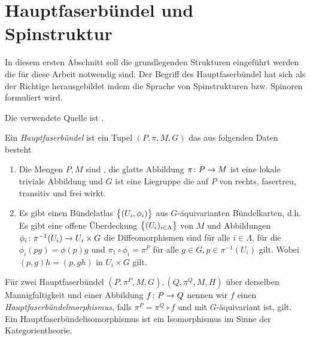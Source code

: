 

\section{Hauptfaserbündel und Spinstruktur}
\label{sec:Hauptfaserbündel und Spinstruktur}

In diesem ersten Abschnitt soll die grundlegenden Strukturen
eingeführt werden die für diese Arbeit notwendig sind. Der Begriff des
Hauptfaserbündel hat sich als der Richtige herausgebildet indem die
Sprache von Spinstrukturen bzw. Spinoren formuliert wird.

Die verwendete Quelle ist \cite{baum09}.

\begin{Def}[Hauptfaserbündel]
  Ein \textit{Hauptfaserbündel} ist ein Tupel $(P,\pi,M,G)$ das aus
  folgenden Daten besteht
	\begin{enumerate}[\textbullet]
        \item Die Mengen $P,M$ sind \mfgen, die glatte Abbildung
          $ \pi \colon P \rightarrow M $ ist eine lokale triviale Abbildung und
          $G$ ist eine Liegruppe die auf $P$ von rechts, fasertreu,
          transitiv und frei wirkt.   
        \item Es gibt einen Bündelatlas $\bigl\{ (U_i,\phi_i) \bigr\}$ aus
          $G$-äquivarianten Bündelkarten, d.h.  Es gibt
           eine offene Überdeckung $\bigl\{ (U_i)_{i \in \Lambda} \bigr\}$ von $ M $ und  Abbildungen
          $ \phi_i \colon \pi^{-1}(U_i) \rightarrow U_i\times G $ die
          Diffeomorphismen sind für alle $i \in \Lambda $, für die
          $ \phi_i(pg) = \phi(p) g $ und
          $ \pi_1 \circ \phi_i = \pi^P $ für alle
          $ g \in G, p \in \pi^{-1}(U_i) $ gilt. Wobei
          $ (p,g) h = (p,gh) $ in $ U_i\times G $ gilt.
	\end{enumerate}		
	Für zwei Hauptfaserbündel $(P,\pi^P,M,G),(Q,\pi^Q,M,H)$ über
        derselben Mannigfaltigkeit und einer Abbildung $f \colon P \rightarrow Q$
        nennen wir $f$ einen \textit{Hauptfaserbündelmorphismus},
        falls $ \pi^P=\pi^Q \circ f $ und mit $ G $-äquivariant ist, gilt. Ein Hauptfaserbündelisomorphismus ist ein Isomorphismus im Sinne
        der Kategorientheorie.
\end{Def}

